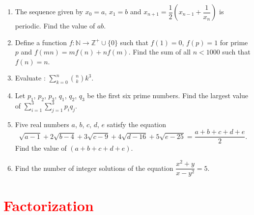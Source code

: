 \documentclass[11pt, a4paper]{article}
\begin{document}
\begin{enumerate}
	\item The sequence given by $x_0 = a$, $x_1 = b$ and $x_{n+1} = \dfrac{1}{2}\left( x_{n-1} + \dfrac{1}{x_n} \right)$ is periodic. Find the value of $ab$.
	
	\item Define a function $f : \mathbb{N} \rightarrow \mathbb{Z}^{+}\cup \{0\}$ such that $f(1) = 0$, $f(p) = 1$ for prime $p$ and $f(mn) = mf(n) + nf(m)$. Find the sum of all $n < 1000$ such that $f(n) = n$.
	
	\item Evaluate : $ \displaystyle{\sum \limits_{k = 0}^{n} \binom{n}{k} k^3} $.

	\item Let $p_1$, $p_2$, $p_3$, $q_1$, $q_2$, $q_3$ be the first six prime numbers. Find the largest value of $\sum \limits_{i = 1}^{3} \sum \limits_{j = 1}^{3} p_i q_j$.
	
	\item Five real numbers $a$, $b$, $c$, $d$, $e$ satisfy the equation
	$$ \sqrt{a-1} + 2\sqrt{b-4} + 3\sqrt{c-9} + 4\sqrt{d-16} + 5\sqrt{e-25} = \dfrac{a+b+c+d+e}{2}.$$ Find the value of $(a+b+c+d+e)$.
	
	\item Find the number of integer solutions of the equation $\dfrac{x^2 + y}{x - y^2} = 5$.
	
\end{enumerate}





\section{\textcolor{red}{Factorization}}
\end{document}
